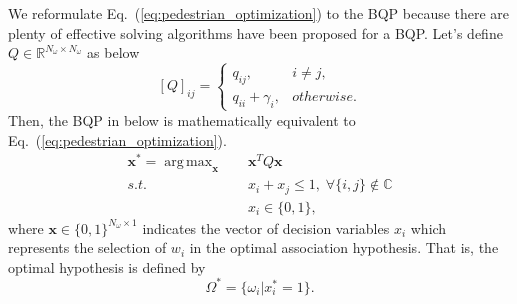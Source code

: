 \documentclass[10pt,twocolumn,letterpaper]{article}
\DeclareMathOperator*{\argmax}{arg\,max}
\begin{document}
We reformulate Eq.~(\ref{eq:pedestrian_optimization}) to the BQP because there are plenty of effective solving algorithms have been proposed for a BQP.
Let's define $Q \in \mathbb{R}^{N_{\omega} \times N_{\omega}}$ as below
\begin{equation}
   \label{eq:Q}
   [Q]_{ij} = 
      \begin{cases}
         q_{ij},            & i \neq j, \\
         q_{ii} + \gamma_i, & otherwise.
      \end{cases}
\end{equation}
Then, the BQP in below is mathematically equivalent to Eq.~(\ref{eq:pedestrian_optimization}).
\begin{equation}
   \label{eq:quadratic_programming}
   \begin{aligned}
      \mathbf{x}^* = \argmax_{\mathbf{x}} & \quad \mathbf{x}^T Q \mathbf{x} \\
                                     s.t. & \quad x_i + x_j \leq 1, \; \forall \{i,j\} \notin \mathbb{C} \\
                                          & \quad x_i \in \{0,1\},
   \end{aligned}
\end{equation}
where $\mathbf{x} \in \{0,1\}^{N_{\omega} \times 1}$ indicates the vector of decision variables $x_i$ which represents the selection of $w_i$ in the optimal association hypothesis.
That is, the optimal hypothesis is defined by
\begin{equation}
   \label{eq:optimal_hypothesis}
   \Omega^* = \{\omega_i | x_i^* = 1\}.
\end{equation}

\end{document}
